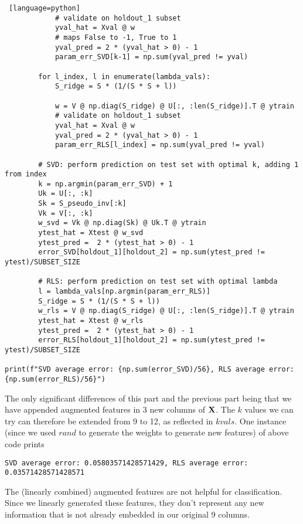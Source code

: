\documentclass[a4paper, 12pt]{article}
\begin{document}
\begin{solution}
\begin{lstlisting} [language=python]
            # validate on holdout_1 subset
            yval_hat = Xval @ w
            # maps False to -1, True to 1
            yval_pred = 2 * (yval_hat > 0) - 1
            param_err_SVD[k-1] = np.sum(yval_pred != yval)
            
        for l_index, l in enumerate(lambda_vals):
            S_ridge = S * (1/(S * S + l))
            
            w = V @ np.diag(S_ridge) @ U[:, :len(S_ridge)].T @ ytrain
            # validate on holdout_1 subset
            yval_hat = Xval @ w
            yval_pred = 2 * (yval_hat > 0) - 1
            param_err_RLS[l_index] = np.sum(yval_pred != yval)
        
        # SVD: perform prediction on test set with optimal k, adding 1 from index
        k = np.argmin(param_err_SVD) + 1
        Uk = U[:, :k]
        Sk = S_pseudo_inv[:k]
        Vk = V[:, :k]
        w_svd = Vk @ np.diag(Sk) @ Uk.T @ ytrain
        ytest_hat = Xtest @ w_svd
        ytest_pred =  2 * (ytest_hat > 0) - 1
        error_SVD[holdout_1][holdout_2] = np.sum(ytest_pred != ytest)/SUBSET_SIZE
        
        # RLS: perform prediction on test set with optimal lambda
        l = lambda_vals[np.argmin(param_err_RLS)]
        S_ridge = S * (1/(S * S + l))
        w_rls = V @ np.diag(S_ridge) @ U[:, :len(S_ridge)].T @ ytrain
        ytest_hat = Xtest @ w_rls
        ytest_pred =  2 * (ytest_hat > 0) - 1
        error_RLS[holdout_1][holdout_2] = np.sum(ytest_pred != ytest)/SUBSET_SIZE

print(f"SVD average error: {np.sum(error_SVD)/56}, RLS average error: {np.sum(error_RLS)/56}")
\end{lstlisting}
    The only significant differences of this part and the previous part being that we have appended augmented features in 3 new columns of $\mathbf{X}$. The $k$ values we can try can therefore be extended from 9 to 12, as reflected in $kvals$. One instance (since we used $rand$ to generate the weights to generate new features) of above code prints
    \begin{lstlisting}
SVD average error: 0.05803571428571429, RLS average error: 0.03571428571428571
\end{lstlisting}

    The (linearly combined) augmented features are not helpful for classification. Since we linearly generated these features, they don't represent any new information that is not already embedded in our original 9 columns.
\end{solution}
\end{document}
